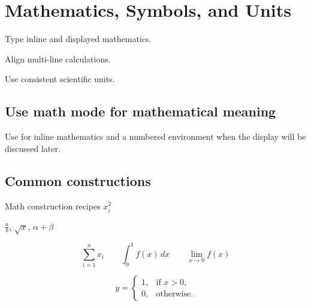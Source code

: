 \chapter{Mathematics, Symbols, and Units}
\label{chap:math}

\begin{learningoutcomes}
  \item Type inline and displayed mathematics.
  \item Align multi-line calculations.
  \item Use consistent scientific units.
\end{learningoutcomes}

\section{Use math mode for mathematical meaning}


Use  for inline mathematics and a
numbered environment when the display will be discussed later.

\section{Common constructions}

\begin{latexcode}{Math construction recipes}
\(x_i^2\)

\(\), \(\), \(\alpha + \beta\)

\[
  \sum_{i=1}^{n} x_i
  \qquad
  \int_0^1 f(x)\,dx
  \qquad
  \lim_{x\to 0} f(x)
\]

\[
  y =
  \begin{cases}
    1, &  x > 0,\\
    0, & 
  \end{cases}
\]
\end{latexcode}


